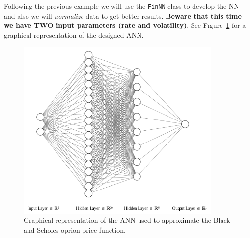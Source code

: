 Following the previous example we will use the \texttt{FinNN}
class to develop the NN and also we will \emph{normalize} data to get
better results. \textbf{Beware that this time we have TWO input
parameters (rate and volatility)}. See Figure~\ref{fig:ann_2} for
a graphical representation of the designed ANN.

\begin{figure}[htb]
	\centering
	\includegraphics[width=0.9\textwidth]{figures/ann_2.png}
	\caption{Graphical representation of the ANN used to approximate the Black and Scholes oprion price function.}
	\label{fig:ann_2}
\end{figure}

